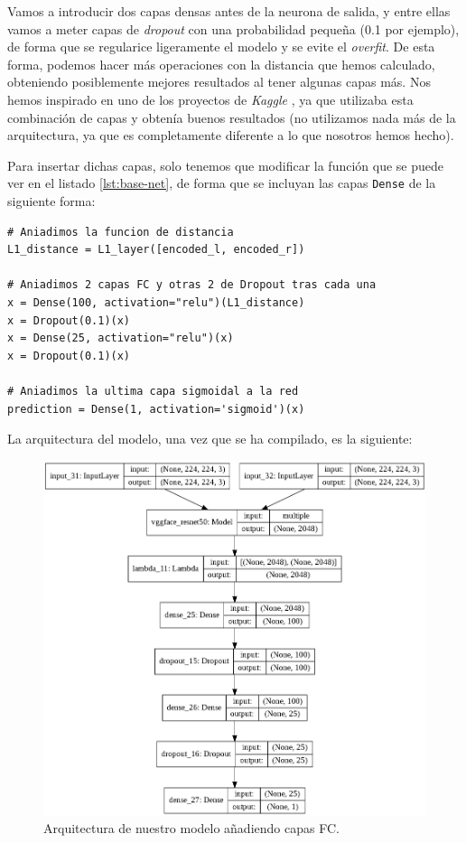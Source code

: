 \documentclass[11pt,a4paper]{article}
\begin{document}
Vamos a introducir dos capas densas antes de la neurona de salida, y entre ellas vamos a meter capas de \textit{dropout}
con una probabilidad pequeña (0.1 por ejemplo), de forma que se regularice ligeramente el modelo y se evite el
\textit{overfit}. De esta forma, podemos hacer más operaciones con la distancia que hemos calculado, obteniendo
posiblemente mejores resultados al tener algunas capas más. Nos hemos inspirado en uno de los proyectos de \textit{Kaggle}
\cite{best-project}, ya que utilizaba esta combinación de capas y obtenía buenos resultados (no utilizamos nada
más de la arquitectura, ya que es completamente diferente a lo que nosotros hemos hecho).

Para insertar dichas capas, solo tenemos que modificar la función que se puede ver en el listado \ref{lst:base-net},
de forma que se incluyan las capas \texttt{Dense} de la siguiente forma:

\begin{lstlisting}
# Aniadimos la funcion de distancia
L1_distance = L1_layer([encoded_l, encoded_r])

# Aniadimos 2 capas FC y otras 2 de Dropout tras cada una
x = Dense(100, activation="relu")(L1_distance)
x = Dropout(0.1)(x)
x = Dense(25, activation="relu")(x)
x = Dropout(0.1)(x)

# Aniadimos la ultima capa sigmoidal a la red
prediction = Dense(1, activation='sigmoid')(x)
\end{lstlisting}

La arquitectura del modelo, una vez que se ha compilado, es la siguiente:

\begin{figure}[H]
    \centering
    \includegraphics[scale=0.4]{img/base-dense.png}
    \caption{Arquitectura de nuestro modelo añadiendo capas FC.}
    \label{fig:base-dense}
\end{figure}
\end{document}
